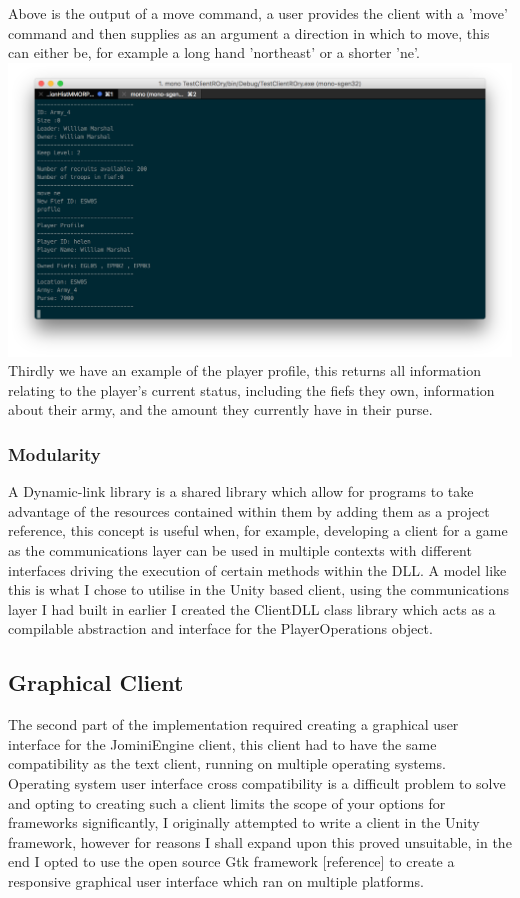 \documentclass{article}
\begin{document}
Above is the output of a move command, a user provides the client with a 'move' command and then supplies as an argument a direction in which to move, this can either be, for example a long hand 'northeast' or a shorter 'ne'. \\
\includegraphics[width=\textwidth]{text5.png}
Thirdly we have an example of the player profile, this returns all information relating to the player's current status, including the fiefs they own, information about their army, and the amount they currently have in their purse.
\subsubsection{Modularity}
A Dynamic-link library is a shared library which allow for programs to take advantage of the resources contained within them by adding them as a project reference, this concept is useful when, for example, developing a client for a game as the communications layer can be used in multiple contexts with different interfaces driving the execution of certain methods within the DLL. A model like this is what I chose to utilise in the Unity based client, using the communications layer I had built in earlier I created the ClientDLL class library which acts as a compilable abstraction and interface for the PlayerOperations object.
\subsection{Graphical Client}
The second part of the implementation required creating a graphical user interface for the JominiEngine client, this client had to have the same compatibility as the text client, running on multiple operating systems. Operating system user interface cross compatibility is a difficult problem to solve and opting to creating such a client limits the scope of your options for frameworks significantly, I originally attempted to write a client in the Unity framework, however for reasons I shall expand upon this proved unsuitable, in the end I opted to use the open source Gtk framework [reference] to create a responsive graphical user interface which ran on multiple platforms.
\end{document}

